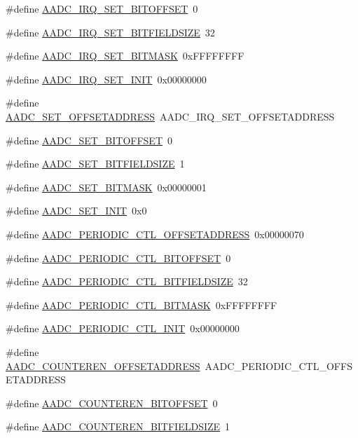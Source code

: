 \begin{DoxyCompactItemize}
\item 
\#define \hyperlink{a00543_a1975c0699b09430289689110d8e0a3b9}{AADC\_\-IRQ\_\-SET\_\-BITOFFSET}~0
\item 
\#define \hyperlink{a00543_a00919a11975076f38d546ced79f55a92}{AADC\_\-IRQ\_\-SET\_\-BITFIELDSIZE}~32
\item 
\#define \hyperlink{a00543_ab14526c6b4a360283714606a082ff71b}{AADC\_\-IRQ\_\-SET\_\-BITMASK}~0xFFFFFFFF
\item 
\#define \hyperlink{a00543_a99dfcfbeec4936ba4f5568cca9cc1b8a}{AADC\_\-IRQ\_\-SET\_\-INIT}~0x00000000
\item 
\#define \hyperlink{a00543_aed4a395bf74f43c7320de00d9def32e9}{AADC\_\-SET\_\-OFFSETADDRESS}~AADC\_\-IRQ\_\-SET\_\-OFFSETADDRESS
\item 
\#define \hyperlink{a00543_a097cbafbe181c2d7d7c34e419cdfee62}{AADC\_\-SET\_\-BITOFFSET}~0
\item 
\#define \hyperlink{a00543_a0b7f942a85dda2912fd71af06318354d}{AADC\_\-SET\_\-BITFIELDSIZE}~1
\item 
\#define \hyperlink{a00543_a5a954ba66fbb57615929c20619852c3f}{AADC\_\-SET\_\-BITMASK}~0x00000001
\item 
\#define \hyperlink{a00543_a69e22793d0f5f9e3a53ed668dae76a7e}{AADC\_\-SET\_\-INIT}~0x0
\item 
\#define \hyperlink{a00543_a741e317ebfea793f44e226468ad0f929}{AADC\_\-PERIODIC\_\-CTL\_\-OFFSETADDRESS}~0x00000070
\item 
\#define \hyperlink{a00543_a692bd2182535b90ad9c488dfdce89b08}{AADC\_\-PERIODIC\_\-CTL\_\-BITOFFSET}~0
\item 
\#define \hyperlink{a00543_a8aa22307663ec3181a1cbc24c3905cc4}{AADC\_\-PERIODIC\_\-CTL\_\-BITFIELDSIZE}~32
\item 
\#define \hyperlink{a00543_a07da5f97822df55cb65ba3f873dc4b60}{AADC\_\-PERIODIC\_\-CTL\_\-BITMASK}~0xFFFFFFFF
\item 
\#define \hyperlink{a00543_addb55f8857f1859e1ac29db348c943d0}{AADC\_\-PERIODIC\_\-CTL\_\-INIT}~0x00000000
\item 
\#define \hyperlink{a00543_aec59431f33a1735c1bb0adf18a115438}{AADC\_\-COUNTEREN\_\-OFFSETADDRESS}~AADC\_\-PERIODIC\_\-CTL\_\-OFFSETADDRESS
\item 
\#define \hyperlink{a00543_a80153af03a92eae6fbad0c1b7ffa7bbd}{AADC\_\-COUNTEREN\_\-BITOFFSET}~0
\item 
\#define \hyperlink{a00543_ac29ea1baf637fdb69a214e589dfc8e3a}{AADC\_\-COUNTEREN\_\-BITFIELDSIZE}~1
\item 

\end{DoxyCompactItemize}
